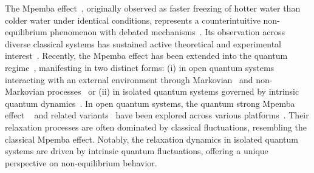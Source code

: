 \documentclass[reprint,superscriptaddress,preprintnumbers,longbibliography,
amsmath,amssymb,aps,floatfix,pra,twocolumn, tightenlines %
]{revtex4-2}
\begin{document}
The Mpemba effect~\cite{Mpemba_effect}, originally observed as faster freezing of hotter water than colder water under identical conditions, represents a counterintuitive non-equilibrium phenomenon with debated mechanisms~\cite{1995_Auerbach,2006_ME,Burridge2016,2020_Burridge}.
Its observation across diverse classical systems has sustained active theoretical and experimental interest~\cite{2017_PNAS_mark,2017_prl_Granular_Fluids,ME_index_prx,Nature2020_colloidal, 2022_prl_Colloids,2024_PRL,Thermomajorization_ME}. Recently, the Mpemba effect has been extended into the quantum regime~\cite{ME_review_classical}, manifesting in two distinct forms: (i) in open quantum systems interacting with an external environment through Markovian~\cite{QNQS_prl,Batteries_QME_2025,IQME_2025,dissipative_dynamics_all_connect,eigenvalue_crossing,NOQS_prr,heat_engines_PRA,open_mark_dot_PRB,PhysRevE_2023_markov,2024_OL,light_ME,dots_jpcm} and non-Markovian processes~\cite{Non_Markovian_QME,non_mark,non_mark_PRA,beyond_mark_2024} or (ii) in isolated quantum systems governed by intrinsic quantum dynamics~\cite{EA_probe,NRP2025,QME_symm_presp_2025}. In open quantum systems, the quantum strong Mpemba effect ~\cite{strong_ME_exponential_acceleration_prl,strong_ME_exponential_acceleration_pra,strong_ME_exponential_acceleration_prr,ME_neq_free_energy,PhysRevE_2025_marko} and related variants~\cite{2024_DMP,PhysRevA_MQME} have been explored across various platforms~\cite{QME_reservoirs_quantum_dot,strong_ME_nc_exp,inverse_ME_ion,2024superconducting_QME}. Their relaxation processes are often dominated by classical fluctuations, resembling the classical Mpemba effect. Notably, the relaxation dynamics in isolated quantum systems are driven by intrinsic quantum fluctuations, offering a unique perspective on non-equilibrium behavior.
\end{document}
